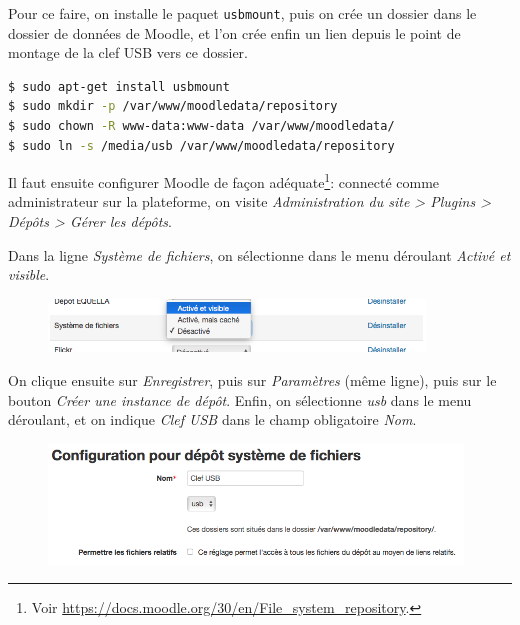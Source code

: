 \documentclass[11pt]{article}
\begin{document}
Pour ce faire, on installe le paquet \lstinline{usbmount}, puis on crée un dossier dans le dossier de données de Moodle, et l'on crée enfin un lien depuis le point de montage de la clef USB vers ce dossier.

\begin{lstlisting}[language=bash]
$ sudo apt-get install usbmount
$ sudo mkdir -p /var/www/moodledata/repository
$ sudo chown -R www-data:www-data /var/www/moodledata/
$ sudo ln -s /media/usb /var/www/moodledata/repository
\end{lstlisting}

Il faut ensuite configurer Moodle de façon adéquate\footnote{Voir \url{https://docs.moodle.org/30/en/File_system_repository}.}: connecté comme administrateur sur la plateforme, on visite \emph{Administration du site > Plugins > Dépôts > Gérer les dépôts}.

Dans la ligne \emph{Système de fichiers}, on sélectionne dans le menu déroulant \emph{Activé et visible}.

\begin{figure}[!ht]
\begin{minipage}[b]{\linewidth}
\centering
\includegraphics[width=10cm]{repo-filesystem-usb-1.png}
\end{minipage}
\end{figure}

On clique ensuite sur \emph{Enregistrer}, puis sur \emph{Paramètres} (même ligne), puis sur le bouton \emph{Créer une instance de dépôt}. Enfin, on sélectionne \emph{usb} dans le menu déroulant, et on indique \emph{Clef USB} dans le champ obligatoire \emph{Nom}.

\begin{figure}[!ht]
\begin{minipage}[b]{\linewidth}
\centering
\includegraphics[width=11cm]{repo-filesystem-usb-2.png}
\end{minipage}
\end{figure}
\end{document}
